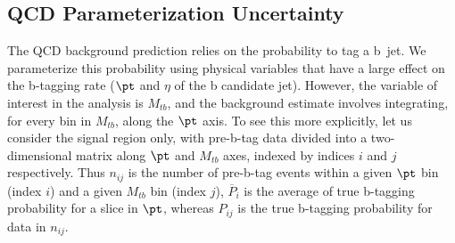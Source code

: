 





\clearpage

\subsection{QCD Parameterization Uncertainty}
\label{sec:qcdpunc}

The QCD background prediction relies on the probability to tag a b~jet.  
We parameterize this probability using physical variables that
have a large effect on the b-tagging rate ($\pt$ and $\eta$ of the b
candidate jet).  However, the variable of interest in the analysis
is $M_{tb}$, and the background estimate involves integrating, for
every bin in $M_{tb}$, along the $\pt$ axis.  To see this more
explicitly, let us consider the signal region only, with pre-b-tag
data divided into a two-dimensional matrix along $\pt$ and
$M_{tb}$ axes, indexed by indices $i$ and $j$ respectively.
Thus $n_{ij}$ is the number of pre-b-tag events within a given $\pt$
bin (index $i$) and a given $M_{tb}$ bin (index $j$), 
$\overline P_i$ is the average of true b-tagging probability for a slice 
in $\pt$, whereas $P_{ij}$ is the true b-tagging probability for
data in $n_{ij}$.

